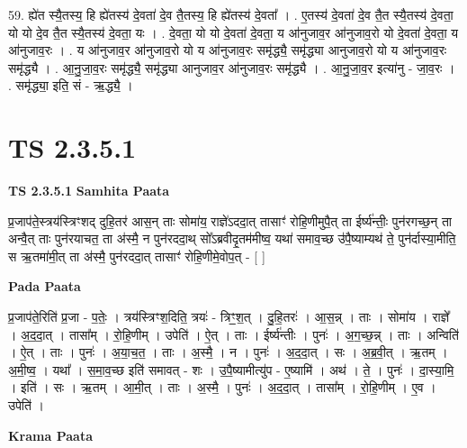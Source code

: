 \documentclass[17pt]{extarticle}
\begin{document}
59. ह्ये॑त स्यै॒तस्य॒ हि ह्ये॑तस्य॑ दे॒वता॑ दे॒व तै॒तस्य॒ हि ह्ये॑तस्य॑ दे॒वता᳚ । . ए॒तस्य॑ दे॒वता॑ दे॒व तै॒त स्यै॒तस्य॑ दे॒वता॒ यो यो दे॒व तै॒त स्यै॒तस्य॑ दे॒वता॒ यः । . दे॒वता॒ यो यो दे॒वता॑ दे॒वता॒ य आ॑नुजाव॒र आ॑नुजाव॒रो यो दे॒वता॑ दे॒वता॒ य आ॑नुजाव॒रः । . य आ॑नुजाव॒र आ॑नुजाव॒रो यो य आ॑नुजाव॒रः समृ॑द्ध्यै॒ समृ॑द्ध्या आनुजाव॒रो यो य आ॑नुजाव॒रः समृ॑द्ध्यै । . आ॒नु॒जा॒व॒रः समृ॑द्ध्यै॒ समृ॑द्ध्या आनुजाव॒र आ॑नुजाव॒रः समृ॑द्ध्यै । . आ॒नु॒जा॒व॒र इत्या॑नु - जा॒व॒रः । . समृ॑द्ध्या॒ इति॒ सं - ऋ॒द्ध्यै॒ । \newline
\pagebreak
{}

\section{ TS 2.3.5.1 }

\textbf{TS 2.3.5.1 } \newline
\textbf{Samhita Paata} \newline

प्र॒जाप॑ते॒स्त्रय॑स्त्रिꣳशद् दुहि॒तर॑ आस॒न् ताः सोमा॑य॒ राज्ञे॑ऽददा॒त् तासाꣳ॑ रोहि॒णीमुपै॒त् ता ईर्ष्य॑न्तीः॒ पुन॑रगच्छ॒न् ता अन्वै॒त् ताः पुन॑रयाचत॒ ता अ॑स्मै॒ न पुन॑रददा॒थ् सो᳚ऽब्रवीदृ॒तम॑मीष्व॒ यथा॑ समाव॒च्छ उ॑पै॒ष्याम्यथ॑ ते॒ पुन॑र्दास्या॒मीति॒ स ऋ॒तमा॑मी॒त् ता अ॑स्मै॒ पुन॑रददा॒त् तासाꣳ॑ रोहि॒णीमे॒वोप॒त् - [  ] \newline

\textbf{Pada Paata} \newline

प्र॒जाप॑ते॒रिति॑ प्र॒जा - प॒तेः॒ । त्रय॑स्त्रिꣳश॒दिति॒ त्रयः॑ - त्रिꣳ॒॒श॒त् । दु॒हि॒तरः॑ । आ॒स॒न्न् । ताः । सोमा॑य । राज्ञे᳚ । अ॒द॒दा॒त् । तासा᳚म् । रो॒हि॒णीम् । उपेति॑ । ऐ॒त् । ताः । ईर्ष्य॑न्तीः । पुनः॑ । अ॒ग॒च्छ॒न्न् । ताः । अन्विति॑ । ऐ॒त् । ताः । पुनः॑ । अ॒या॒च॒त॒ । ताः । अ॒स्मै॒ । न । पुनः॑ । अ॒द॒दा॒त् । सः । अ॒ब्र॒वी॒त् । ऋ॒तम् । अ॒मी॒ष्व॒ । यथा᳚ । स॒मा॒व॒च्छ इति॑ समावत् - शः । उ॒पै॒ष्यामीत्यु॑प - ए॒ष्यामि॑ । अथ॑ । ते॒ । पुनः॑ । दा॒स्या॒मि॒ । इति॑ । सः । ऋ॒तम् । आ॒मी॒त् । ताः । अ॒स्मै॒ । पुनः॑ । अ॒द॒दा॒त् । तासा᳚म् । रो॒हि॒णीम् । ए॒व । उपेति॑ ।  \newline


\textbf{Krama Paata} \newline
\end{document}
